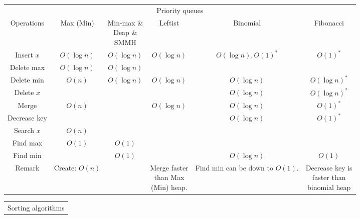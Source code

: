 \begin{enumerate}
    \begin{table}[H]
        \centering
        \begin{tabular}{|c|c|c|c|c|c|}
            \hline
            \multicolumn{6}{|c|}{Priority queues} \\
            \Xhline{3\arrayrulewidth}
            Operations & Max (Min) & \makecell{Min-max \&\\Deap \&\\SMMH} & Leftist & Binomial & Fibonacci \\
            \Xhline{2\arrayrulewidth}
            Insert $x$ & $O(\log n)$ & $O(\log n)$ & $O(\log n)$ & $O(\log n), O(1)^*$ & $O(1)^*$ \\
            \hline
            Delete max & $O(\log n)$ & $O(\log n)$ & & & \\
            \hline
            Delete min & $O(n)$ & $O(\log n)$ & $O(\log n)$ & $O(\log n)$ & $O(\log n)^*$ \\
            \hline
            Delete $x$ & & & & $O(\log n)$ & $O(\log n)^*$ \\
            \hline
            Merge & $O(n)$ & & $O(\log n)$ & $O(\log n)$ & $O(1)^*$ \\
            \hline
            Decrease key & & & & $O(\log n)$ & $O(1)^*$ \\
            \hline
            Search $x$ & $O(n)$ & & & & \\
            \hline
            Find max & $O(1)$ & $O(1)$ & & & \\
            \hline
            Find min & & $O(1)$ & & $O(\log n)$ & $O(1)$ \\
            \hline
            Remark & \makecell{Create:\\$O(n)$} & & \makecell{Merge faster\\than Max\\(Min) heap.} & \makecell{Find min\\can be down\\to $O(1)$.} & \makecell{Decrease key is\\faster than\\binomial heap} \\
            \hline
        \end{tabular}
    \end{table} 
    \begin{table}[H]
        \centering
        \begin{tabular}{|c|c|c|c|c|c|}
            \hline
            \multicolumn{6}{|c|}{Sorting algorithms} \\

\end{tabular}
\end{table}
\end{enumerate}
